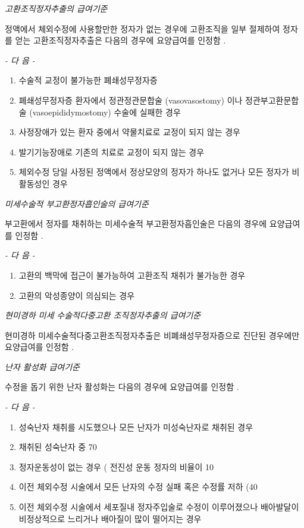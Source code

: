 \emph{고환조직정자추출의 급여기준}\par 
정액에서 체외수정에 사용할만한 정자가 없는 경우에 고환조직을  일부 절제하여 정자를 얻는 고환조직정자추출은 다음의 경우에 요양급여를 인정함 . \par

\emph{-  다 음  -}\par 
\begin{enumerate}[가.]\tightlist
\item 수술적 교정이 불가능한 폐쇄성무정자증 
\item 폐쇄성무정자증 환자에서 정관정관문합술 (vasovasostomy) 이나 정관부고환문합술 (vasoepididymostomy)  수술에 실패한  경우 
\item 사정장애가 있는 환자 중에서 약물치료로 교정이 되지 않는  경우 
\item 발기기능장애로 기존의 치료로 교정이 되지 않는 경우 
\item 체외수정 당일 사정된 정액에서 정상모양의 정자가 하나도  없거나 모든 정자가  비활동성인  경우 
\end{enumerate} 

\emph{미세수술적 부고환정자흡인술의 급여기준}\par 
부고환에서 정자를 채취하는 미세수술적 부고환정자흡인술은 다음의 경우에 요양급여를 인정함 . \par

\emph{-  다 음  -}\par 
\begin{enumerate}[가.]\tightlist
\item 고환의 백막에 접근이 불가능하여 고환조직 채취가 불가능한 경우 
\item 고환의 악성종양이 의심되는 경우 
\end{enumerate} 

\emph{현미경하 미세 수술적다중고환 조직정자추출의 급여기준}\par 
현미경하 미세수술적다중고환조직정자추출은 비폐쇄성무정자증으로 진단된 경우에만 요양급여를 인정함 . \par

\par  
\emph{난자 활성화 급여기준}\par 
수정을 돕기 위한 난자 활성화는 다음의 경우에 요양급여를 인정함 . \par

\emph{-  다 음  -}\par  
\begin{enumerate}[가.]\tightlist
\item 성숙난자 채취를 시도했으나 모든 난자가 미성숙난자로 채취된 경우 
\item 채취된 성숙난자 중  70%
\item 정자운동성이 없는 경우 ( 전진성 운동 정자의 비율이  10%
\item 이전 체외수정 시술에서 모든 난자의 수정 실패 혹은 수정률  저하 (40%
\item 이전 체외수정 시술에서 세포질내 정자주입술로 수정이  이루어졌으나 배아발달이 비정상적으로 느리거나 배아질이  많이 떨어지는 경우 
\end{enumerate} 

